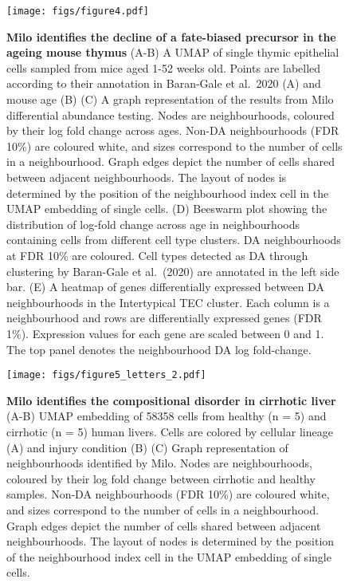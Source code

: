 \documentclass[
  10pt,
]{article}
\begin{document}
\begin{figure}
\centering
\texttt{[image: figs/figure4.pdf]}
\caption{\label{fig:fig-4}\textbf{Milo identifies the decline of a fate-biased precursor in the ageing mouse thymus}
(A-B) A UMAP of single thymic epithelial cells sampled from mice aged 1-52 weeks old. Points are labelled according to their annotation in Baran-Gale et al.~2020 (A) and mouse age (B)
(C) A graph representation of the results from Milo differential abundance testing. Nodes are neighbourhoods, coloured by their log fold change across ages. Non-DA neighbourhoods (FDR 10\%) are coloured white, and sizes correspond to the number of cells in a neighbourhood. Graph edges depict the number of cells shared between adjacent neighbourhoods. The layout of nodes is determined by the position of the neighbourhood index cell in the UMAP embedding of single cells.
(D) Beeswarm plot showing the distribution of log-fold change across age in neighbourhoods containing cells from different cell type clusters. DA neighbourhoods at FDR 10\% are coloured. Cell types detected as DA through clustering by Baran-Gale et al.~(2020) are annotated in the left side bar.
(E) A heatmap of genes differentially expressed between DA neighbourhoods in the Intertypical TEC cluster. Each column is a neighbourhood and rows are differentially expressed genes (FDR 1\%). Expression values for each gene are scaled between 0 and 1. The top panel denotes the neighbourhood DA log fold-change.}
\end{figure}







\begin{figure}
\centering
\texttt{[image: figs/figure5\_letters\_2.pdf]}
\caption{\label{fig:fig-5}\textbf{Milo identifies the compositional disorder in cirrhotic liver}
(A-B) UMAP embedding of 58358 cells from healthy (n = 5) and cirrhotic (n = 5) human livers. Cells are colored by cellular lineage (A) and injury condition (B)
(C) Graph representation of neighbourhoods identified by Milo.
Nodes are neighbourhoods, coloured by their log fold change between cirrhotic and healthy samples. Non-DA neighbourhoods (FDR 10\%) are coloured white, and sizes correspond to the number of cells in a neighbourhood. Graph edges depict the number of cells shared between adjacent neighbourhoods. The layout of nodes is determined by the position of the neighbourhood index cell in the UMAP embedding of single cells.}
\end{figure}
\end{document}
